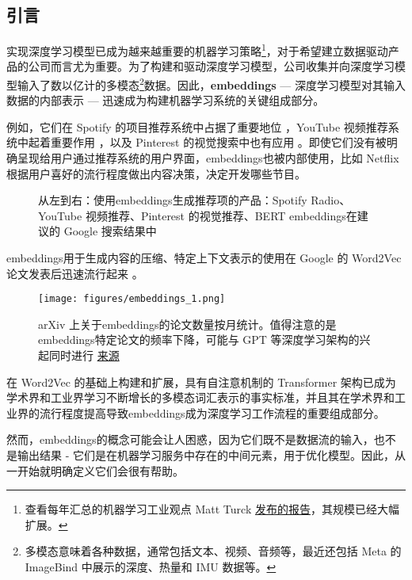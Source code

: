 \documentclass[Chinese, 11pt, table]{diazessay} %
\begin{document}
\begin{CJK}{UTF8}{gbsn}
\begin{sloppypar}
\section{引言}

实现深度学习模型已成为越来越重要的机器学习策略\footnote{查看每年汇总的机器学习工业观点 Matt Turck \href{https://mattturck.com/mad2023/}{发布的报告}，其规模已经大幅扩展。}，对于希望建立数据驱动产品的公司而言尤为重要。为了构建和驱动深度学习模型，公司收集并向深度学习模型输入了数以亿计的多模态\footnote{多模态意味着各种数据，通常包括文本、视频、音频等，最近还包括 Meta 的 ImageBind 中展示的深度、热量和 IMU 数据等。}数据。因此，\textbf{embeddings} --- 深度学习模型对其输入数据的内部表示 --- 迅速成为构建机器学习系统的关键组成部分。

例如，它们在 Spotify 的项目推荐系统中占据了重要地位 \citep{hansen2020contextual}，YouTube 视频推荐系统中起着重要作用 \citep{covington2016deep}，以及 Pinterest 的视觉搜索中也有应用 \citep{jing2015visual}。即使它们没有被明确呈现给用户通过推荐系统的用户界面，embeddings也被内部使用，比如 Netflix 根据用户喜好的流行程度做出内容决策，决定开发哪些节目。

\begin{figure}[H]
\caption{从左到右：使用embeddings生成推荐项的产品：Spotify Radio、YouTube 视频推荐、Pinterest 的视觉推荐、BERT embeddings在建议的 Google 搜索结果中}
\end{figure}

embeddings用于生成内容的压缩、特定上下文表示的使用在 Google 的 Word2Vec 论文发表后迅速流行起来 \citep{mikolov2013efficient}。

\begin{figure}[H]
\centering
\texttt{[image: figures/embeddings\_1.png]}
\caption{arXiv 上关于embeddings的论文数量按月统计。值得注意的是embeddings特定论文的频率下降，可能与 GPT 等深度学习架构的兴起同时进行 \href{https://github.com/veekaybee/what_are_embeddings/blob/main/notebooks/fig_2_embeddings_papers.ipynb}{来源}}
\end{figure}

在 Word2Vec 的基础上构建和扩展，具有自注意机制的 Transformer \citep{vaswani2017attention} 架构已成为学术界和工业界学习不断增长的多模态词汇表示的事实标准，并且其在学术界和工业界的流行程度提高导致embeddings成为深度学习工作流程的重要组成部分。

然而，embeddings的概念可能会让人困惑，因为它们既不是数据流的输入，也不是输出结果 - 它们是在机器学习服务中存在的中间元素，用于优化模型。因此，从一开始就明确定义它们会很有帮助。


\end{sloppypar}
\end{CJK}
\end{document}
